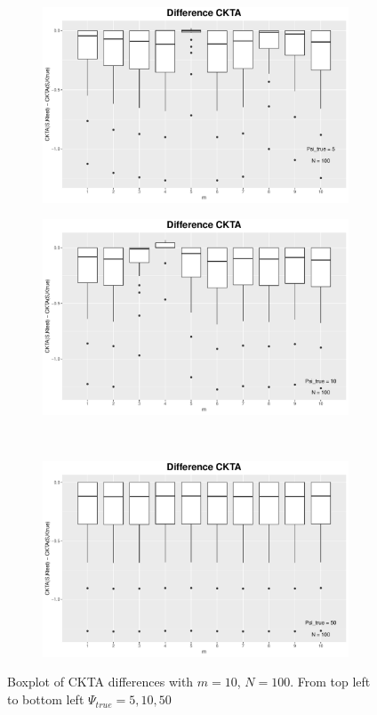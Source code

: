 \documentclass[11pt, a4paper]{article} %
\begin{document}
\begin{landscape}
\begin{figure}
\begin{subfigure}{\textwidth}
  \centering
  \includegraphics[width=.8\linewidth]{dif_ckta_psi_5.pdf}
  \label{fig:sfig1}
\end{subfigure}%
\begin{subfigure}{\textwidth}
  \centering
  \includegraphics[width=.8\linewidth]{dif_ckta_psi_10.pdf}
  \label{fig:sfig2}
\end{subfigure}\\

\begin{subfigure}{\textwidth}
  \centering
  \includegraphics[width=.8\linewidth]{dif_ckta_psi_50.pdf}
  \label{fig:sfig1}
\end{subfigure}

\caption{Boxplot of CKTA differences with $m = 10$, $N = 100$. From top left to bottom left $\Psi_{true} = 5, 10, 50$}
\label{fig1}
\end{figure}

\end{landscape}
\end{document}
